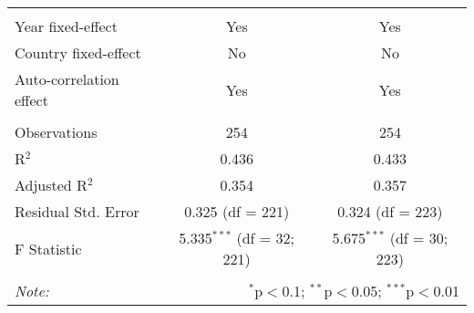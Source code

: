 \begin{table}[!htbp]
\begin{tabular}{@{\extracolsep{5pt}}lcc}
\hline \\[-1.8ex] 
Year fixed-effect & Yes & Yes \\ 
Country fixed-effect & No & No \\ 
Auto-correlation effect & Yes & Yes \\ 
\hline \\[-1.8ex] 
Observations & 254 & 254 \\ 
R$^{2}$ & 0.436 & 0.433 \\ 
Adjusted R$^{2}$ & 0.354 & 0.357 \\ 
Residual Std. Error & 0.325 (df = 221) & 0.324 (df = 223) \\ 
F Statistic & 5.335$^{***}$ (df = 32; 221) & 5.675$^{***}$ (df = 30; 223) \\ 
\hline 
\hline \\[-1.8ex] 
\textit{Note:}  & \multicolumn{2}{r}{$^{*}$p$<$0.1; $^{**}$p$<$0.05; $^{***}$p$<$0.01} \\ 
\end{tabular} 
\end{table} 
